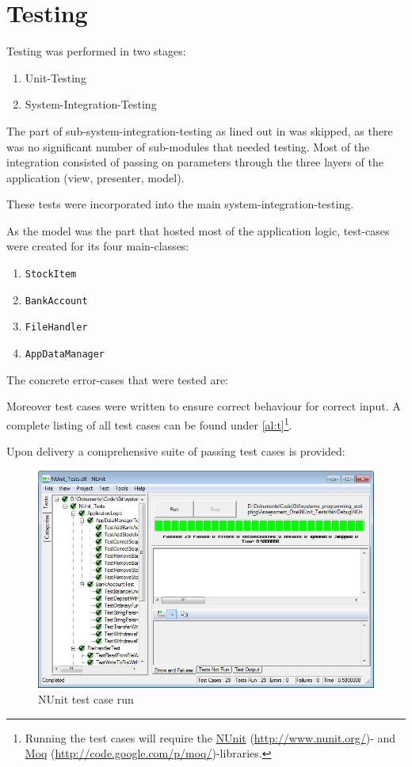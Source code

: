 \chapter{Testing}\label{ch:testing} %

Testing was performed in two stages:

\begin{enumerate}
\item Unit-Testing
\item System-Integration-Testing
\end{enumerate}

The part of sub-system-integration-testing as lined out in \textcite[520]{Sommerville2006} was skipped, as there was no significant number of sub-modules that needed testing. Most of the integration consisted of passing on parameters through the three layers of the application (view, presenter, model).

These tests were incorporated into the main system-integration-testing.

As the model was the part that hosted most of the application logic, test-cases were created for its four main-classes:

\begin{enumerate}
\item \texttt{StockItem}
\item \texttt{BankAccount}
\item \texttt{FileHandler}
\item \texttt{AppDataManager}
\end{enumerate}

The concrete error-cases that were tested are:


Moreover test cases were written to ensure correct behaviour for correct input.
A complete listing of all test cases can be found under \autoref{al:t}\footnote{Running the test cases will require the \href{http://www.nunit.org/}{NUnit} (\url{http://www.nunit.org/})- and \href{http://code.google.com/p/moq/}{Moq} (\url{http://code.google.com/p/moq/})-libraries.}.

Upon delivery a comprehensive suite of passing test cases is provided:

\begin{figure}[H]
\begin{center}
\includegraphics[width=\textwidth]{gfx/nunit.png}
\caption{NUnit test case run}
\label{fig:nunit}
\end{center}
\end{figure}